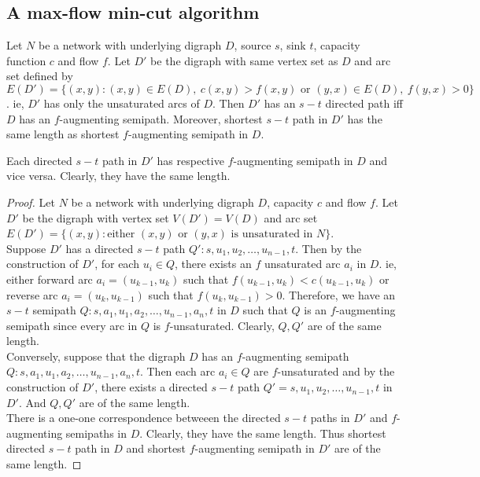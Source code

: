 \subsection{A max-flow min-cut algorithm}
\begin{theorem}
	Let $N$ be a network with underlying digraph $D$, source $s$, sink $t$, capacity function $c$ and flow $f$.
	Let $D'$ be the digraph with same vertex set as $D$ and arc set defined by $E(D') = \{ (x,y) : (x,y) \in E(D),\ c(x,y) > f(x,y) \text{ or } (y,x) \in E(D),\ f(y,x) > 0 \}$.
	ie, $D'$ has only the unsaturated arcs of $D$.
	Then $D'$ has an $s-t$ directed path iff $D$ has an $f$-augmenting semipath.
	Moreover, shortest $s-t$ path in $D'$ has the same length as shortest $f$-augmenting semipath in $D$.
\end{theorem}
\begin{synopsis}
	Each directed $s-t$ path in $D'$ has respective $f$-augmenting semipath in $D$ and vice versa.
	Clearly, they have the same length.
\end{synopsis}
\begin{proof}
	Let $N$ be a network with underlying digraph $D$, capacity $c$ and flow $f$.
	Let $D'$ be the digraph with vertex set $V(D') = V(D)$ and arc set $E(D') = \{ (x,y) : \text{either }(x,y) \text{ or } (y,x) \text{ is unsaturated in } N \}$.\\


	Suppose $D'$ has a directed $s-t$ path $Q' : s,u_1,u_2,\dots,u_{n-1},t$.
	Then by the construction of $D'$, for each $u_i \in Q$, there exists an $f$ unsaturated arc $a_i$ in $D$.
	ie, either forward arc $a_i = (u_{k-1},u_k)$ such that $f(u_{k-1},u_k) < c(u_{k-1},u_k)$ or reverse arc $a_i = (u_k,u_{k-1})$ such that $f(u_k,u_{k-1}) > 0$.
	Therefore, we have an $s-t$ semipath $Q : s,a_1,u_1,a_2,\dots,u_{n-1},a_n,t$ in $D$ such that $Q$ is an $f$-augmenting semipath since every arc in $Q$ is $f$-unsaturated.
	Clearly, $Q,Q'$ are of the same length.\\


	Conversely, suppose that the digraph $D$ has an $f$-augmenting semipath $Q : s,a_1,u_1,a_2,\dots,u_{n-1},a_n,t$.
	Then each arc $a_i \in Q$ are $f$-unsaturated and by the construction of $D'$, there exists a directed $s-t$ path $Q' = s,u_1,u_2,\dots,u_{n-1},t$ in $D'$.
	And $Q,Q'$ are of the same length.\\


	There is a one-one correspondence betweeen the directed $s-t$ paths in $D'$ and $f$-augmenting semipaths in $D$.
	Clearly, they have the same length.
	Thus shortest directed $s-t$ path in $D$ and shortest $f$-augmenting semipath in $D'$ are of the same length.
\end{proof}

